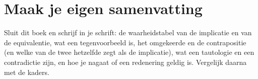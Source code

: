 
\ifzelfstudie
\section*{Maak je eigen samenvatting}
Sluit dit boek en schrijf in je schrift: de waarheidstabel van de implicatie en van de equivalentie, wat een tegenvoorbeeld is, het omgekeerde en de contrapositie (en welke van de twee hetzelfde zegt als de implicatie), wat een tautologie en een contradictie zijn, en hoe je nagaat of een redenering geldig is. Vergelijk daarna met de kaders.
\fi
